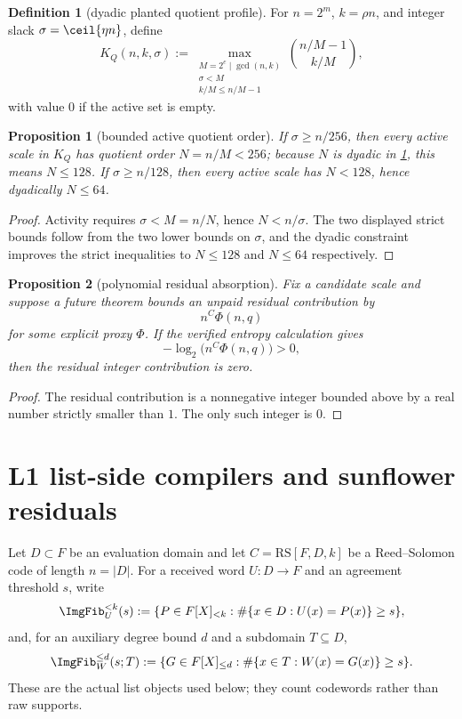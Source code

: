 \documentclass[11pt]{article}
\newtheorem{proposition}[proposition]{Proposition}
\theoremstyle{definition}
\newtheorem{definition}[definition]{Definition}
\theoremstyle{remark}
\newcommand{\RS}{\mathrm{RS}}
\begin{document}
\begin{definition}[dyadic planted quotient profile]\label{def:capf-qprofile}
For $n=2^m$, $k=\rho n$, and integer slack $\sigma=\ceil{\eta n}$, define
\[
K_Q(n,k,\sigma):=
\max_{\substack{M=2^e\mid\gcd(n,k)\\ \sigma<M\\ k/M\le n/M-1}}
\binom{n/M-1}{k/M},
\]
with value $0$ if the active set is empty.
\end{definition}

\begin{proposition}[bounded active quotient order]\label{prop:capf-qprofile}
If $\sigma\ge n/256$, then every active scale in $K_Q$ has quotient order $N=n/M<256$; because $N$ is dyadic in \cref{def:capf-qprofile}, this means $N\le128$.  If $\sigma\ge n/128$, then every active scale has $N<128$, hence dyadically $N\le64$.
\end{proposition}

\begin{proof}
Activity requires $\sigma<M=n/N$, hence $N<n/\sigma$.  The two displayed strict bounds follow from the two lower bounds on $\sigma$, and the dyadic constraint improves the strict inequalities to $N\le128$ and $N\le64$ respectively.
\end{proof}

\begin{proposition}[polynomial residual absorption]\label{prop:capf-integrality}
Fix a candidate scale and suppose a future theorem bounds an unpaid residual contribution by
\[
        n^C\Phi(n,q)
\]
for some explicit proxy $\Phi$.  If the verified entropy calculation gives
\[
        -\log_2\bigl(n^C\Phi(n,q)\bigr)>0,
\]
then the residual integer contribution is zero.
\end{proposition}

\begin{proof}
The residual contribution is a nonnegative integer bounded above by a real number strictly smaller than $1$.  The only such integer is $0$.
\end{proof}

\section{L1 list-side compilers and sunflower residuals}\label{sec:capf-l1}

Let $D\subset F$ be an evaluation domain and let $C=\RS[F,D,k]$ be a Reed--Solomon code of length $n=|D|$.  For a received word $U:D\to F$ and an agreement threshold $s$, write
\[
        \ImgFib_U^{<k}(s):=
        \{P\in F[X]_{<k}: \#\{x\in D:U(x)=P(x)\}\ge s\},
\]
and, for an auxiliary degree bound $d$ and a subdomain $T\subseteq D$,
\[
        \ImgFib_W^{\le d}(s;T):=
        \{G\in F[X]_{\le d}: \#\{x\in T:W(x)=G(x)\}\ge s\}.
\]
These are the actual list objects used below; they count codewords rather than raw supports.
\end{document}
